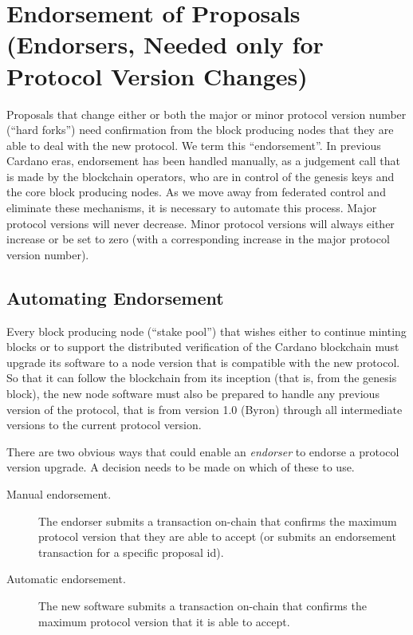 \newpage
\section{Endorsement of Proposals (Endorsers, Needed only for Protocol Version Changes)}
\label{sect:endorsement}

Proposals that change either or both the major or minor protocol version number (``hard forks'') need confirmation from the block producing nodes that they are able
to deal with the new protocol.  We term this ``endorsement''.   In previous Cardano eras, endorsement has been handled manually, as a judgement call that
is made by the blockchain operators, who are in control of the genesis keys and the core block producing nodes.  As we move away from federated control and eliminate these
mechanisms, it is necessary to automate this process.  Major protocol versions will never decrease.  Minor protocol versions will always either increase or be set to zero
(with a corresponding increase in the major protocol version number).

\subsection{Automating Endorsement}

Every block producing node (``stake pool'') that wishes either to continue minting
blocks or to support the distributed verification of the Cardano blockchain must upgrade its
software to a node version that is compatible with the new protocol.  So that it
can follow the blockchain from its inception (that is, from the genesis block),
the new node software must also be prepared to handle any previous version of
the protocol, that is from version 1.0 (Byron) through all intermediate versions to the current protocol version.

There are two obvious ways that could enable an \emph{endorser} to endorse a protocol version upgrade.  A decision needs
to be made on which of these to use.

\begin{description}
\item
  [Manual endorsement.]  The endorser submits a transaction on-chain that confirms the maximum protocol version that they are
  able to accept (or submits an endorsement transaction for a specific proposal id).
\item
  [Automatic endorsement.]  The new software submits a transaction on-chain that confirms the maximum protocol version that it is
  able to accept.
\end{description}


